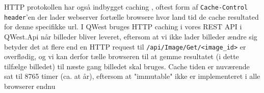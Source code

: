 HTTP protokollen har også indbygget caching \cite{HTTPcaching}, oftest form af \texttt{Cache-Control header}'en der lader webserver fortælle browsere hvor land tid de cache resultated for denne specifikke url. I QWest bruges HTTP caching i vores REST API i QWest.Api når billeder bliver leveret, eftersom at vi ikke lader billeder ændre sig betyder det at flere end en HTTP request til \texttt{/api/Image/Get/<image\_id>} er overflødig, og vi kan derfor tælle browseren til at gemme resultatet (i dette tilfælge billedet) til næste gang billedet skal bruges. Cache tiden er nuværende sat til 8765 timer (ca. at år), eftersom at "immutable" ikke er implementeret i alle browserer endnu